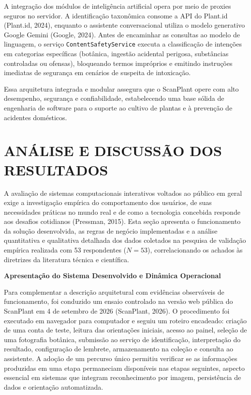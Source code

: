 \documentclass[12pt,a4paper]{article}
\begin{document}
A integração dos módulos de inteligência artificial opera por meio de proxies seguros no servidor. A identificação taxonômica consome a API do Plant.id (Plant.id, 2024), enquanto o assistente conversacional utiliza o modelo generativo Google Gemini (Google, 2024). Antes de encaminhar as consultas ao modelo de linguagem, o serviço \texttt{ContentSafetyService} executa a classificação de intenções em categorias específicas (botânica, ingestão acidental perigosa, substâncias controladas ou ofensas), bloqueando termos impróprios e emitindo instruções imediatas de segurança em cenários de suspeita de intoxicação.

Essa arquitetura integrada e modular assegura que o ScanPlant opere com alto desempenho, segurança e confiabilidade, estabelecendo uma base sólida de engenharia de software para o suporte ao cultivo de plantas e à prevenção de acidentes domésticos.

\section{ANÁLISE E DISCUSSÃO DOS RESULTADOS}

A avaliação de sistemas computacionais interativos voltados ao público em geral exige a investigação empírica do comportamento dos usuários, de suas necessidades práticas no mundo real e de como a tecnologia concebida responde aos desafios cotidianos (Pressman, 2015). Esta seção apresenta o funcionamento da solução desenvolvida, as regras de negócio implementadas e a análise quantitativa e qualitativa detalhada dos dados coletados na pesquisa de validação empírica realizada com 53 respondentes ($N = 53$), correlacionando os achados às diretrizes da literatura técnica e científica.

\vspace{0.3cm}
\noindent \textbf{Apresentação do Sistema Desenvolvido e Dinâmica Operacional}\par
\vspace{0.1cm}

Para complementar a descrição arquitetural com evidências observáveis de funcionamento, foi conduzido um ensaio controlado na versão web pública do ScanPlant em 4 de setembro de 2026 (ScanPlant, 2026). O procedimento foi executado em navegador para computador e seguiu um roteiro encadeado: criação de uma conta de teste, leitura das orientações iniciais, acesso ao painel, seleção de uma fotografia botânica, submissão ao serviço de identificação, interpretação do resultado, configuração de lembrete, armazenamento na coleção e consulta ao assistente. A adoção de um percurso único permitiu verificar se as informações produzidas em uma etapa permaneciam disponíveis nas etapas seguintes, aspecto essencial em sistemas que integram reconhecimento por imagem, persistência de dados e orientação automatizada.
\end{document}
